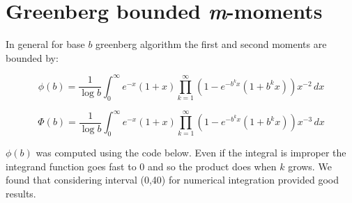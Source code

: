 \begin{appendices}
\begin{table}[H]
\caption[\emph{Clipped Modified Binary Tree}: performance report.]{\emph{Clipped Modified Binary Tree}: performance report. Experimental results}
\begin{center}
\end{center}
\end{table}


\section{Greenberg bounded \emph{m}-moments}
\label{sec:greenberg-moments}
In general for base $b$ greenberg algorithm the first and second moments are bounded by:

\begin{equation}
\phi(b)= \frac{1}{\log b} \int_{0}^{\infty} \! e^{-x}(1+x) \prod_{k=1}^{\infty}(1-e^{-b^{k}x}(1+b^{k}x))x^{-2} \, dx
\label{eq:greenberg-b-phi}
\end{equation}

\begin{equation}
\Phi(b)= \frac{1}{\log b} \int_{0}^{\infty} \! e^{-x}(1+x) \prod_{k=1}^{\infty}(1-e^{-b^{k}x}(1+b^{k}x))x^{-3} \, dx
\label{eq:greenberg-b-Phi}
\end{equation}

\noindent $\phi(b)$ was computed using the code below. Even if the integral is improper the integrand function goes fast to 0 and so the product does when $k$ grows. We found that considering interval (0,40) for numerical integration provided good results.\\







\end{appendices}
